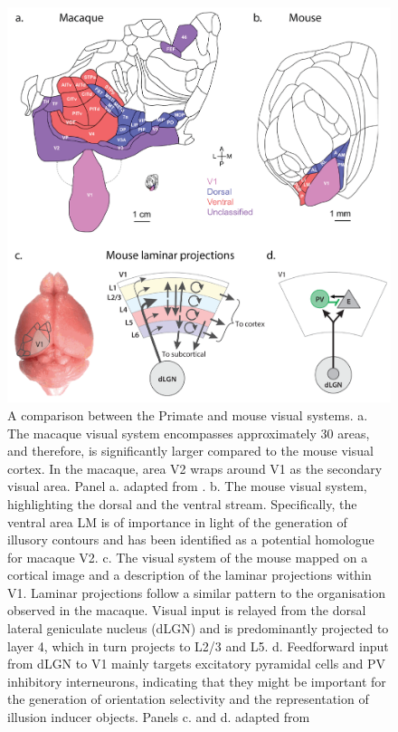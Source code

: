 \documentclass[12pt]{article}
\begin{document}
\begin{figure}[H]
  \centering
  \includegraphics[width=1.0 \textwidth]{adjusted_figures/Laminar_Figure.png}
  \caption{A comparison between the Primate and mouse visual systems. a. The macaque visual system encompasses approximately 30 areas, and therefore, is significantly larger compared to the mouse visual cortex. In the macaque, area V2 wraps around V1 as the secondary visual area. Panel a. adapted from \textcite{gamanutAnatomicalFunctionalConnectomes2022}. b. The mouse visual system, highlighting the dorsal and the ventral stream. Specifically, the ventral area LM is of importance in light of the generation of illusory contours and has been identified as a potential homologue for macaque V2. c. The visual system of the mouse mapped on a cortical image and a description of the laminar projections within V1.  Laminar projections follow a similar pattern to the organisation observed in the macaque. Visual input is relayed from the dorsal lateral geniculate nucleus (dLGN) and is predominantly projected to layer 4, which in turn projects to L2/3 and L5. d. Feedforward input from dLGN to V1 mainly targets excitatory pyramidal cells and PV inhibitory interneurons, indicating that they might be important for the generation of orientation selectivity and the representation of illusion inducer objects. Panels c. and d. adapted from \textcite{niellHowCorticalCircuits2021}}
  \label{fig:Laminar_Figure}
\end{figure}
\end{document}
